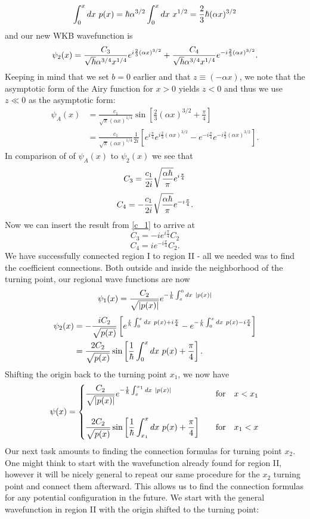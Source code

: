 \documentclass[11pt,letterpaper]{article}
\begin{document}
\begin{enumerate}
\begin{enumerate}
$$\int_0^{x}{dx\ p(x)} = \hbar\alpha^{3/2}\int_0^{x}{dx\ x^{1/2}} = \frac{2}{3}\hbar(\alpha x)^{3/2}$$
and our new WKB wavefunction is
 $$\psi_{2}(x) = \frac{C_3}{\sqrt{\hbar}\alpha^{3/4}x^{1/4}}e^{i\frac{2}{3}(\alpha x)^{3/2}}+\frac{C_4}{\sqrt{\hbar}\alpha^{3/4}x^{1/4}}e^{-i\frac{2}{3}(\alpha x)^{3/2}}.$$
 Keeping in mind that we set $b=0$ earlier and that $z\equiv(-\alpha x)$, we note that the asymptotic form of the Airy function for $x>0$ yields $z<0$ and thus we use $z\ll 0$ as the asymptotic form:
 \begin{align*}\psi_A(x) &= \frac{c_1}{\sqrt\pi(\alpha x)^{1/4}}\sin\left[\frac{2}{3}(\alpha x)^{3/2}+\frac{\pi}{4}\right]\\
 &=\frac{c_1}{\sqrt\pi(\alpha x)^{1/4}}\frac{1}{2i}\left[e^{i\frac{\pi}{4}}e^{i\frac{2}{3}(\alpha x)^{3/2}}-e^{-i\frac{\pi}{4}}e^{-i\frac{2}{3}(\alpha x)^{3/2}}\right].
 \end{align*}
 In comparison of of $\psi_A(x)$ to $\psi_2(x)$ we see that
 $$C_3 = \frac{c_1}{2i}\sqrt{\frac{\alpha\hbar}{\pi}}e^{i\frac{\pi}{4}}$$
 $$C_4 = -\frac{c_1}{2i}\sqrt{\frac{\alpha\hbar}{\pi}}e^{-i\frac{\pi}{4}}.$$
 Now we can insert the result from \eqref{c_1} to arrive at
  $$C_3 = -ie^{i\frac{\pi}{4}}C_2$$
  $$C_4 = ie^{-i\frac{\pi}{4}}C_2.$$
 We have successfully connected region I to region II - all we needed was to find the coefficient connections. Both outside and inside the neighborhood of the turning point, our regional wave functions are now
$$\psi_1(x) = \frac{C_2}{\sqrt{|p(x)|}}e^{-\frac{1}{\hbar}\int_x^0{dx\ |p(x)|}}$$
 \begin{align*}\psi_{2}(x) &= -\frac{iC_2}{\sqrt{p(x)}}\left[e^{\frac{i}{\h}\int^x_0{dx\ p(x)}+i\frac{\pi}{4}}-e^{-\frac{i}{\h}\int^x_0{dx\ p(x)}-i\frac{\pi}{4}}\right]\\
 &=\frac{2C_2}{\sqrt{p(x)}}\sin\left[\frac{1}{\h}\int_0^x{dx\ p(x)}+\frac{\pi}{4}\right].\end{align*}
 Shifting the origin back to the turning point $x_1$, we now have
 $$\psi(x) = \begin{cases} \displaystyle\frac{C_2}{\sqrt{|p(x)|}}e^{-\frac{1}{\h}\int_x^{x_1}{dx\ |p(x)|}}&\quad\text{for}\quad x<x_1\\ \\\displaystyle
\frac{2C_2}{\sqrt{p(x)}}\sin\left[\frac{1}{\h}\int_{x_1}^x{dx\ p(x)}+\frac{\pi}{4}\right]&\quad\text{for}\quad x_1<x \end{cases}$$
 Our next task amounts to finding the connection formulas for turning point $x_2$. One might think to start with the wavefunction already found for region II, however it will be nicely general to repeat our same procedure for the $x_2$ turning point and connect them afterward. This allows us to find the connection formulas for any potential configuration in the future. We start with the general wavefunction in region II with the origin shifted to the turning point:

\end{enumerate}
\end{enumerate}
\end{document}
